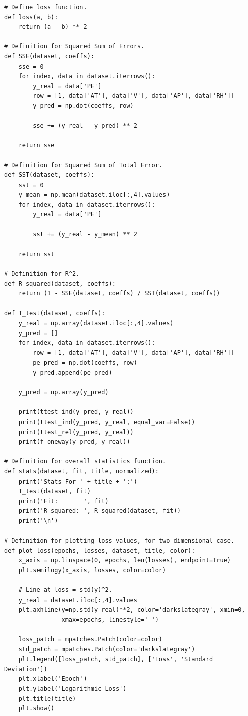 \documentclass[letterpaper]{article} %
\begin{document}
{\begin{verbatim}
# Define loss function.
def loss(a, b):
    return (a - b) ** 2

# Definition for Squared Sum of Errors.
def SSE(dataset, coeffs):
    sse = 0
    for index, data in dataset.iterrows():
        y_real = data['PE']
        row = [1, data['AT'], data['V'], data['AP'], data['RH']]
        y_pred = np.dot(coeffs, row)

        sse += (y_real - y_pred) ** 2

    return sse

# Definition for Squared Sum of Total Error.
def SST(dataset, coeffs):
    sst = 0
    y_mean = np.mean(dataset.iloc[:,4].values)
    for index, data in dataset.iterrows():
        y_real = data['PE']

        sst += (y_real - y_mean) ** 2

    return sst

# Definition for R^2.
def R_squared(dataset, coeffs):
    return (1 - SSE(dataset, coeffs) / SST(dataset, coeffs))

def T_test(dataset, coeffs):
    y_real = np.array(dataset.iloc[:,4].values)
    y_pred = []
    for index, data in dataset.iterrows():
        row = [1, data['AT'], data['V'], data['AP'], data['RH']]
        pe_pred = np.dot(coeffs, row)
        y_pred.append(pe_pred)

    y_pred = np.array(y_pred)

    print(ttest_ind(y_pred, y_real))
    print(ttest_ind(y_pred, y_real, equal_var=False))
    print(ttest_rel(y_pred, y_real))
    print(f_oneway(y_pred, y_real))

# Definition for overall statistics function.
def stats(dataset, fit, title, normalized):
    print('Stats For ' + title + ':')
    T_test(dataset, fit)
    print('Fit:       ', fit)
    print('R-squared: ', R_squared(dataset, fit))
    print('\n')

# Definition for plotting loss values, for two-dimensional case.
def plot_loss(epochs, losses, dataset, title, color):
    x_axis = np.linspace(0, epochs, len(losses), endpoint=True)
    plt.semilogy(x_axis, losses, color=color)

    # Line at loss = std(y)^2.
    y_real = dataset.iloc[:,4].values
    plt.axhline(y=np.std(y_real)**2, color='darkslategray', xmin=0,
                xmax=epochs, linestyle='-')

    loss_patch = mpatches.Patch(color=color)
    std_patch = mpatches.Patch(color='darkslategray')
    plt.legend([loss_patch, std_patch], ['Loss', 'Standard Deviation'])
    plt.xlabel('Epoch')
    plt.ylabel('Logarithmic Loss')
    plt.title(title)
    plt.show()


\end{verbatim}}
\end{document}
